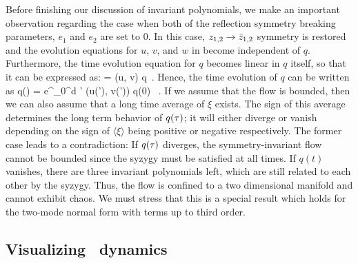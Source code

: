 \documentclass[aip,cha,
reprint,
secnumarabic,
nofootinbib, tightenlines,
nobibnotes, showkeys, showpacs,
superscriptaddress,
]{revtex4-1}
\begin{document}
Before finishing our discussion of invariant polynomials, we make an important 
observation regarding the case when both of the reflection symmetry breaking
parameters, $e_{1}$ and $e_2$ are set to $0$. In this case, 
$z_{1,2} \rightarrow \bar{z}_{1,2}$ symmetry is restored and the 
evolution equations for $u$, $v$, and $w$ in  become 
independent of $q$. Furthermore, the time evolution equation for $q$ becomes 
linear in $q$ itself, so that it can be expressed as:
\beq
     = \xi (u, v) q \,.
Hence, the time evolution of $q$ can be written as
\beq
    q(\zeit) =  e^{\int_0^\zeit d \zeit' \xi (u(\zeit'), v(\zeit'))} q(0) \, .
If we assume that the flow is bounded, then we can also assume that a long 
time average of $\xi$ exists. The sign of this average determines the long 
term behavior of $q(\tau)$; it will either diverge or vanish depending on the 
sign of $\langle \xi \rangle$ being positive or negative respectively. The 
former case leads to a contradiction: If $q(\tau)$ diverges, the 
symmetry-invariant flow cannot be bounded since the syzygy  
must be satisfied at all times. If $q(t)$ vanishes, there are three invariant 
polynomials left, which are still related to each other by the syzygy. Thus, 
the flow is confined to a two dimensional manifold and cannot exhibit chaos.
We must stress that this is a special result which holds for the two-mode 
normal form with terms up to third order.

\subsection{Visualizing \twomode\ dynamics}
\label{s:visual}
\end{document}

